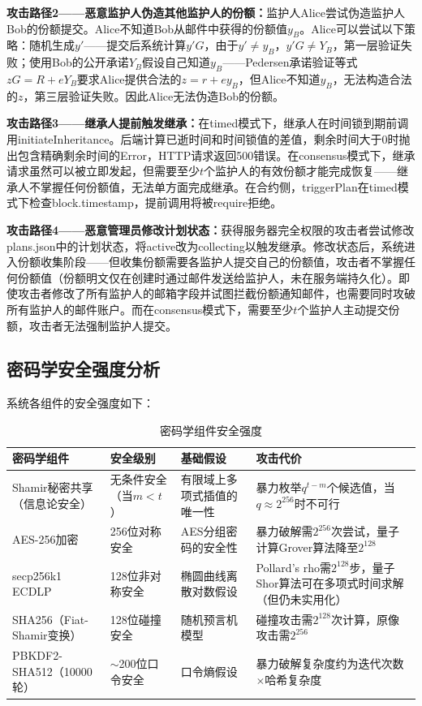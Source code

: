 \documentclass[UTF8,a4paper,zihao=-4,openany]{ctexrep}
\begin{document}
\textbf{攻击路径2——恶意监护人伪造其他监护人的份额：}监护人Alice尝试伪造监护人Bob的份额提交。Alice不知道Bob从邮件中获得的份额值$y_B$。Alice可以尝试以下策略：随机生成$y'$——提交后系统计算$y'G$，由于$y' \neq y_B$，$y'G \neq Y_B$，第一层验证失败；使用Bob的公开承诺$Y_B$假设自己知道$y_B$——Pedersen承诺验证等式$zG = R + eY_B$要求Alice提供合法的$z = r + ey_B$，但Alice不知道$y_B$，无法构造合法的$z$，第三层验证失败。因此Alice无法伪造Bob的份额。

\textbf{攻击路径3——继承人提前触发继承：}在timed模式下，继承人在时间锁到期前调用initiateInheritance。后端计算已逝时间和时间锁值的差值，剩余时间大于0时抛出包含精确剩余时间的Error，HTTP请求返回500错误。在consensus模式下，继承请求虽然可以被立即发起，但需要至少$t$个监护人的有效份额才能完成恢复——继承人不掌握任何份额值，无法单方面完成继承。在合约侧，triggerPlan在timed模式下检查block.timestamp，提前调用将被require拒绝。

\textbf{攻击路径4——恶意管理员修改计划状态：}获得服务器完全权限的攻击者尝试修改plans.json中的计划状态，将active改为collecting以触发继承。修改状态后，系统进入份额收集阶段——但收集份额需要各监护人提交自己的份额值，攻击者不掌握任何份额值（份额明文仅在创建时通过邮件发送给监护人，未在服务端持久化）。即使攻击者修改了所有监护人的邮箱字段并试图拦截份额通知邮件，也需要同时攻破所有监护人的邮件账户。而在consensus模式下，需要至少$t$个监护人主动提交份额，攻击者无法强制监护人提交。

\subsection{密码学安全强度分析}

系统各组件的安全强度如下：

\begin{table}[htbp]
\centering
\caption{密码学组件安全强度}
\begin{tabularx}{\textwidth}{p{3.2cm}p{2.5cm}p{3cm}p{5.8cm}}
\toprule
密码学组件 & 安全级别 & 基础假设 & 攻击代价\\
\midrule
Shamir秘密共享（信息论安全） & 无条件安全（当$m<t$） & 有限域上多项式插值的唯一性 & 暴力枚举$q^{t-m}$个候选值，当$q\approx 2^{256}$时不可行\\
AES-256加密 & 256位对称安全 & AES分组密码的安全性 & 暴力破解需$2^{256}$次尝试，量子计算Grover算法降至$2^{128}$\\
secp256k1 ECDLP & 128位非对称安全 & 椭圆曲线离散对数假设 & Pollard's rho需$2^{128}$步，量子Shor算法可在多项式时间求解（但仍未实用化）\\
SHA256（Fiat-Shamir变换） & 128位碰撞安全 & 随机预言机模型 & 碰撞攻击需$2^{128}$次计算，原像攻击需$2^{256}$\\
PBKDF2-SHA512（10000轮） & $\sim$200位口令安全 & 口令熵假设 & 暴力破解复杂度约为迭代次数$\times$哈希复杂度\\
\bottomrule
\end{tabularx}
\end{table}
\end{document}
